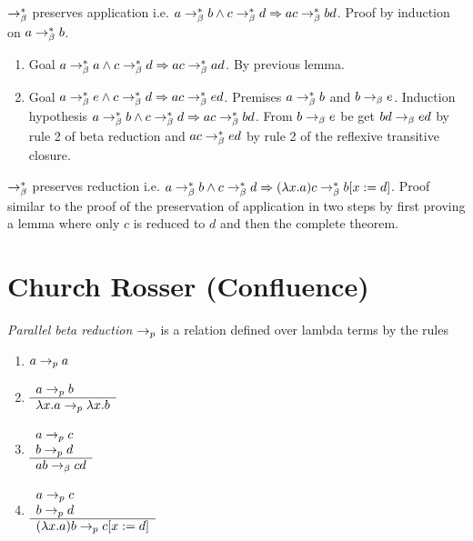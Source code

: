 \documentclass{article}
\begin{document}
\begin{theorem}
  $\to^*_\beta$ preserves application
  i.e. $a \to^*_\beta b \land c \to^*_\beta d \Rightarrow a c \to^*_\beta b d$.
  Proof by induction on $a \to^*_\beta b$.
  \begin{enumerate}
  \item
    Goal $a \to^*_\beta a \land c \to^*_\beta d \Rightarrow a c \to^*_\beta a d$.
    By previous lemma.
  \item
    Goal $a \to^*_\beta e \land c \to^*_\beta d \Rightarrow a c \to^*_\beta e d$.
    Premises $a \to^*_\beta b$ and $b \to_\beta e$.
    Induction hypothesis $a \to^*_\beta b \land c \to^*_\beta d \Rightarrow
    a c\to^*_\beta b d$.
    From $b \to_\beta e$ be get $b d \to_\beta e d$ by rule 2 of beta reduction
    and $a c \to^*_\beta e d$ by rule 2 of the reflexive transitive closure.
  \end{enumerate}
\end{theorem}



\begin{theorem}
  $\to^*_\beta$ preserves reduction
  i.e. $a \to^*_\beta b \land c \to^*_\beta d \Rightarrow
  (\lambda x.a) c \to^*_\beta b[x:=d]$.
  Proof similar to the proof of the preservation of application in two steps
  by first proving a lemma where only $c$ is reduced to $d$ and then the
  complete theorem.
\end{theorem}






\section{Church Rosser (Confluence)}

\begin{definition}
  \emph{Parallel beta reduction} $\to_{p}$ is a relation
  defined over lambda terms by the rules
  \begin{enumerate}
  \item $a \to_{p} a$
  \item $\begin{array}{l} a \to_{p} b \\ \hline \lambda x.a \to_{p} \lambda x.b\end{array}$
  \item $\begin{array}{l} a\to_{p} c \\ b \to_{p} d \\ \hline a b \to_\beta c d\end{array}$
  \item $\begin{array}{l} a\to_{p} c \\ b \to_{p} d \\ \hline (\lambda x.a) b \to_{p} c[x := d]\end{array}$
  \end{enumerate}
\end{definition}
\end{document}
